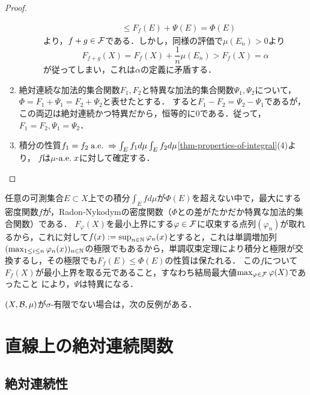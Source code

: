 \documentclass[uplatex, dvipdfmx]{jsreport}
\begin{document}
\begin{proof}
\begin{enumerate}
\begin{description}
\begin{align*}
                &\le F_f(E)+\Psi(E)=\Phi(E)
            \end{align*}
            より，$f+g\in\mathcal{F}$である．しかし，同様の評価で$\mu(E_n)>0$より
            \[F_{f+g}(X)=F_f(X)+\frac{1}{n}\mu(E_n)>F_f(X)=\alpha\]
            が従ってしまい，これは$\alpha$の定義に矛盾する．
        \end{description}
        \item 絶対連続な加法的集合関数$F_1,F_2$と特異な加法的集合関数$\Psi_1,\Psi_2$について，$\Phi=F_1+\Psi_1=F_2+\Psi_2$と表せたとする．
        すると$F_1-F_2=\Psi_2-\Psi_1$であるが，この両辺は絶対連続かつ特異だから，恒等的に$0$である．従って，$F_1=F_2,\Psi_1=\Psi_2$．
        \item 積分の性質$f_1=f_2\;\mathrm{a.e.}\;\Rightarrow\int_Ef_1d\mu\int_Ef_2d\mu$\ref{thm-properties-of-integral}(4)より，
        $f$は$\mu$-$\mathrm{a.e.}\; x$に対して確定する．
    \end{enumerate}
\end{proof}
\begin{remarks}[列を巧みに用いた構成]
    \item 任意の可測集合$E\subset X$上での積分$\int_Efd\mu$が$\Phi(E)$を超えない中で，最大にする密度関数$f$が，Radon-Nykodymの密度関数（$\Phi$との差がたかだか特異な加法的集合関数）である．
    $F_\varphi(X)$を最小上界にする$\varphi\in\mathcal{F}$に収束する点列$(\varphi_n)$が取れるから，これに対して$f(x):=\sup_{n\in\mathbb{N}}\varphi_n(x)$とすると，これは単調増加列$(\max_{1\le i\le n}\varphi_n(x))_{n\in\mathbb{N}}$の極限でもあるから，単調収束定理により積分と極限が交換するし，その極限でも$F_f(E)\le\Phi(E)$の性質は保たれる．
    この$f$について$F_f(X)$が最小上界を取る元であること，すなわち結局最大値$\max_{\varphi\in\mathcal{F}}\varphi(X)$であったこと
    により，$\Psi$は特異になる．
\end{remarks}
\begin{counterexample}
    $(X,\mathcal{B},\mu)$が$\sigma$-有限でない場合は，次の反例がある．
\end{counterexample}

\section{直線上の絶対連続関数}

\subsection{絶対連続性}
\end{document}
